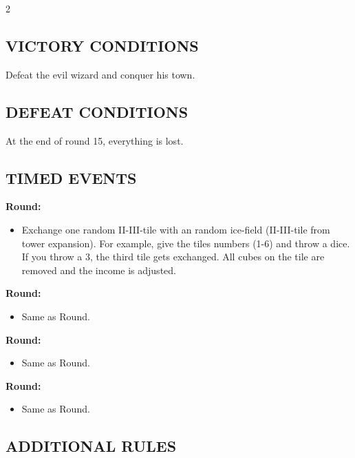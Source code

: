 \begin{multicols*}{2}
\subsection*{\MakeUppercase{Victory Conditions}}
Defeat the evil wizard and conquer his town.

\subsection*{\MakeUppercase{Defeat Conditions}}
At the end of round 15, everything is lost.

\subsection*{\MakeUppercase{Timed Events}}

\textbf{ Round:}
\begin{itemize}
  \item Exchange one random II-III-tile with an random ice-field (II-III-tile from tower expansion). For example, give the tiles numbers (1-6) and throw a dice. If you throw a 3, the third tile gets exchanged. All cubes on the tile are removed and the income is adjusted. 
\end{itemize}

\textbf{ Round:}
\begin{itemize}
  \item Same as  Round.
\end{itemize}

\textbf{ Round:}
\begin{itemize}
  \item Same as  Round.
\end{itemize}

\textbf{ Round:}
\begin{itemize}
  \item Same as  Round.
\end{itemize}

\subsection*{\MakeUppercase{Additional Rules}}


\end{multicols*}
